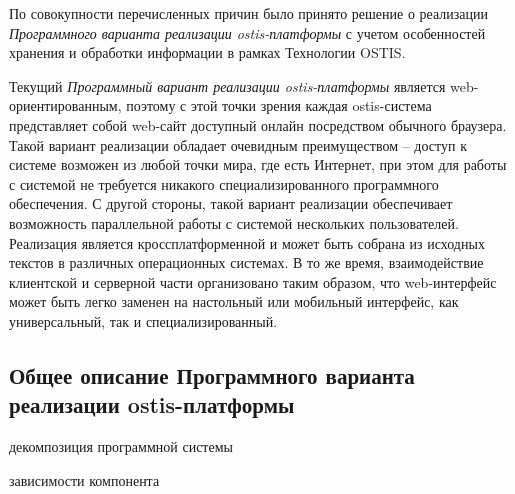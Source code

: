 По совокупности перечисленных причин было принято решение о реализации \textit{Программного варианта реализации ostis-платформы}  с учетом особенностей хранения и обработки информации в рамках Технологии OSTIS.

Текущий \textit{Программный вариант реализации ostis-платформы} является web-ориентированным, поэтому с этой точки зрения каждая \mbox{ostis-система} представляет собой web-сайт доступный онлайн посредством обычного браузера. Такой вариант реализации обладает очевидным преимуществом -- доступ к системе возможен из любой точки мира, где есть Интернет, при этом для работы с системой не требуется никакого специализированного программного обеспечения. С другой стороны, такой вариант реализации обеспечивает возможность параллельной работы с системой нескольких пользователей. Реализация является кроссплатформенной и может быть собрана из исходных текстов в различных операционных системах. В то же время, взаимодействие клиентской и серверной части организовано таким образом, что \mbox{web-интерфейс} может быть легко заменен на настольный или мобильный интерфейс, как универсальный, так и специализированный.

\subsection{Общее описание Программного варианта реализации ostis-платформы}

\begin{SCn}
\begin{scnindent}
\end{scnindent}
\begin{scnrelfromset}{декомпозиция программной системы}
\end{scnrelfromset}
\begin{scnrelfromset}{зависимости компонента}
\end{scnrelfromset}
\end{SCn}

